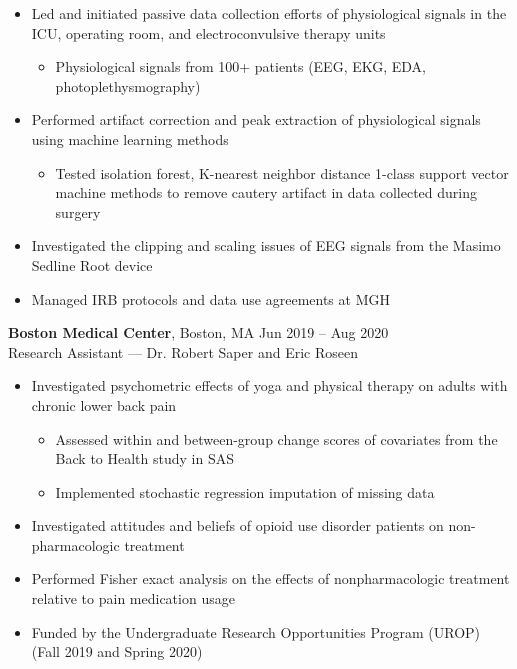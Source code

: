 \documentclass[11pt,letterpaper]{article}
\begin{document}
\begin{itemize}
\item Led and initiated passive data collection efforts of physiological signals in the ICU, operating room, and electroconvulsive therapy units
    \begin{itemize}
    \item Physiological signals from 100+ patients (EEG, EKG, EDA, photoplethysmography)
    \end{itemize}

\item Performed artifact correction and peak extraction of physiological signals using machine learning methods
    \begin{itemize}
    \item Tested isolation forest, K-nearest neighbor distance 1-class support vector machine methods to remove cautery artifact in data collected during surgery
    \end{itemize}

\item Investigated the clipping and scaling issues of EEG signals from the Masimo Sedline Root device
\item Managed IRB protocols and data use agreements at MGH
\end{itemize}

\vspace{6pt}

\textbf{Boston Medical Center}, Boston, MA \hfill Jun 2019 -- Aug 2020\\
Research Assistant — Dr. Robert Saper and Eric Roseen

\begin{itemize}
\item Investigated psychometric effects of yoga and physical therapy on adults with chronic lower back pain
    \begin{itemize}
    \item Assessed within and between-group change scores of covariates from the Back to Health study in SAS
    \item Implemented stochastic regression imputation of missing data
    \end{itemize}

\item Investigated attitudes and beliefs of opioid use disorder patients on non-pharmacologic treatment
\item Performed Fisher exact analysis on the effects of nonpharmacologic treatment relative to pain medication usage
\item Funded by the Undergraduate Research Opportunities Program (UROP) (Fall 2019 and Spring 2020)
\end{itemize}
\end{document}
